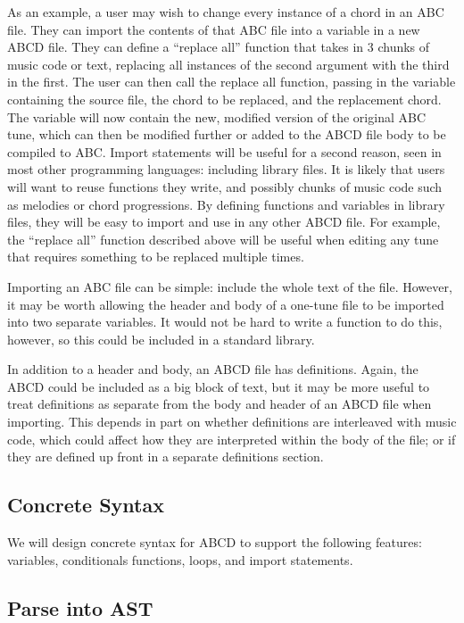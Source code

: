 	As an example, a user may wish to change every instance of a chord in an ABC file. They can import the contents of that ABC file into a variable in a new ABCD file. They can define a “replace all” function that takes in 3 chunks of music code or text, replacing all instances of the second argument with the third in the first. The user can then call the replace all function, passing in the variable containing the source file, the chord to be replaced, and the replacement chord. The variable will now contain the new, modified version of the original ABC tune, which can then be modified further or added to the ABCD file body to be compiled to ABC.
	Import statements will be useful for a second reason, seen in most other programming languages: including library files. It is likely that users will want to reuse functions they write, and possibly chunks of music code such as melodies or chord progressions. By defining functions and variables in library files, they will be easy to import and use in any other ABCD file. For example, the “replace all” function described above will be useful when editing any tune that requires something to be replaced multiple times.
	
	Importing an ABC file can be simple: include the whole text of the file. However, it may be worth allowing the header and body of a one-tune file to be imported into two separate variables. It would not be hard to write a function to do this, however, so this could be included in a standard library.
	
	In addition to a header and body, an ABCD file has definitions. Again, the ABCD could be included as a big block of text, but it may be more useful to treat definitions as separate from the body and header of an ABCD file when importing. This depends in part on whether definitions are interleaved with music code, which could affect how they are interpreted within the body of the file; or if they are defined up front in a separate definitions section.

\subsection{Concrete Syntax}
We will design concrete syntax for ABCD to support the following features: variables, conditionals functions, loops, and import statements.
\subsection{Parse into AST}

